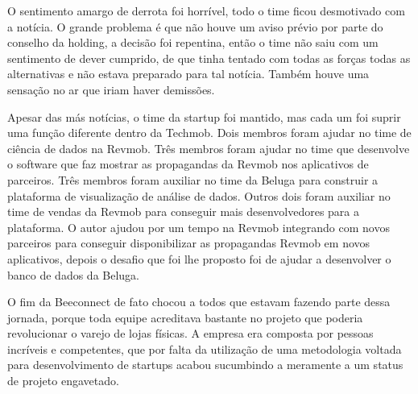 O sentimento amargo de derrota foi horrível, todo o time ficou desmotivado com a notícia. O grande problema é que não houve um aviso prévio por parte do conselho da holding, a decisão foi repentina, então o time não saiu com um sentimento de dever cumprido, de que tinha tentado com todas as forças todas as alternativas e não estava preparado para tal notícia. Também houve uma sensação no ar que iriam haver demissões.

Apesar das más notícias, o time da startup foi mantido, mas cada um foi suprir uma função diferente dentro da Techmob. Dois membros foram ajudar no time de ciência de dados na Revmob. Três membros foram ajudar no time que desenvolve o software que faz mostrar as propagandas da Revmob nos aplicativos de parceiros. Três membros foram auxiliar no time da Beluga para construir a plataforma de visualização de análise de dados. Outros dois foram auxiliar no time de vendas da Revmob para conseguir mais desenvolvedores para a plataforma. O autor ajudou por um tempo na Revmob integrando com novos parceiros para conseguir disponibilizar as propagandas Revmob em novos aplicativos, depois o desafio que foi lhe proposto foi de ajudar a desenvolver o banco de dados da Beluga.

O fim da Beeconnect de fato chocou a todos que estavam fazendo parte dessa jornada, porque toda equipe acreditava bastante no projeto que poderia revolucionar o varejo de lojas físicas. A empresa era composta por pessoas incríveis e competentes, que por falta da utilização de uma metodologia voltada para desenvolvimento de startups acabou sucumbindo a meramente a um status de projeto engavetado.